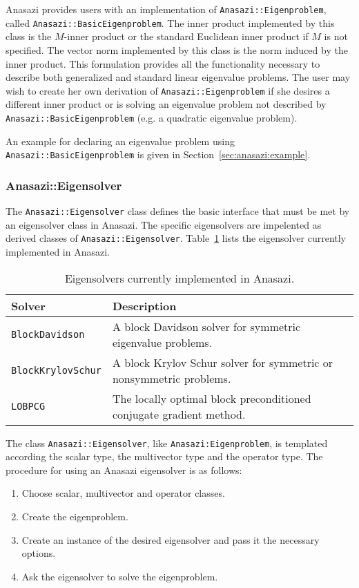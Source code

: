 Anasazi provides users with an implementation of \verb!Anasazi::Eigenproblem!,
called \verb!Anasazi::BasicEigenproblem!.  The inner product implemented by this
class is the $M$-inner product or the standard Euclidean inner product if $M$ is
not specified. The vector norm implemented by this class is the norm induced by
the inner product.  This formulation provides all the functionality necessary to
describe both generalized and standard linear eigenvalue problems. The user may
wish to create her own derivation of \verb!Anasazi::Eigenproblem! if she desires
a different inner product or is solving an eigenvalue problem not described by
\verb!Anasazi::BasicEigenproblem! (e.g. a quadratic eigenvalue problem).

An example for declaring an eigenvalue problem using
\verb!Anasazi::BasicEigenproblem! is given in Section~\ref{sec:anasazi:example}.

\subsubsection{Anasazi::Eigensolver}
\label{sec:anasazi:eigensolver}

The \verb!Anasazi::Eigensolver! class defines the basic interface that must be
met by an eigensolver class in Anasazi. The specific eigensolvers are impelented
as derived classes of \verb!Anasazi::Eigensolver!.
Table~\ref{tab:anasazi:solvers} lists the eigensolver currently implemented in
Anasazi.

\begin{table}[htp]
\begin{center}
\begin{tabular}{| p{4cm} p{8cm} |}
\hline
Solver & Description \\
\hline
{\tt BlockDavidson}    & A block Davidson solver for symmetric
                         eigenvalue problems.\\
{\tt BlockKrylovSchur} & A block Krylov Schur solver for symmetric or
                         nonsymmetric problems.\\
{\tt LOBPCG} & The locally optimal block preconditioned conjugate gradient
method.\\
\hline
\end{tabular}
\caption{Eigensolvers currently implemented in Anasazi.}
\label{tab:anasazi:solvers}
\end{center}
\end{table}

The class \verb!Anasazi::Eigensolver!, like \verb!Anasazi:Eigenproblem!, is
templated according the scalar type, the multivector type and the operator
type. The procedure for using an Anasazi eigensolver is as follows:
\begin{enumerate}
\item Choose scalar, multivector and operator classes.
\item Create the eigenproblem.
\item Create an instance of the desired eigensolver and pass it the necessary
options.
\item Ask the eigensolver to solve the eigenproblem.
\end{enumerate}

